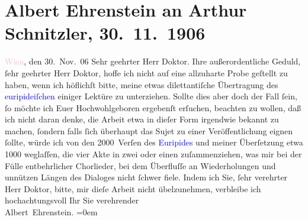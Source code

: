

               \section[Albert Ehrenstein an Arthur Schnitzler, 30. 11. 1906]{ Albert Ehrenstein an Arthur Schnitzler, 30. 11. 1906}\nopagebreak{}\rehead{ }\normalsize\beginnumbering{} \toendnotes[C]{\smallbreak\pagebreak[2]} 
\toendnotes[C]{\smallbreak}\pstart
           \raggedleft{}{\pb}\textcolor{pink}{Wien}{}\ledrightnote{\textcolor{pink}{Wien}}, den 30. Nov. 06\pend
           \pstart{}Sehr geehrter Herr Doktor.\pend\pstart
           Ihre außerordentliche Geduld, ſehr geehrter Herr Doktor, hoffe ich nicht auf eine
                    allzuharte Probe geſtellt zu haben, wenn ich höflichſt bitte, meine etwas
                    dilettantiſche Übertragung des \textcolor{blue}{euripideiſchen}{}\ledrightnote{\textcolor{blue}{Euripides}}{ }\label{K_L01640_1v}\label{K_L01640_1h} einiger Lektüre zu
                    unterziehen. Sollte dies aber doch der Fall ſein, ſo möchte ich Euer
                    Hochwohlgeboren ergebenſt erſuchen, beachten zu wollen, daß ich nicht daran
                    denke, die Arbeit etwa in dieſer Form {\pb}irgendwie bekannt zu machen, ſondern falls ſich überhaupt das Sujet zu einer
                    Veröffentlichung eignen ſollte, würde ich von den 2000 Verſen des \textcolor{blue}{Euripides}{}\ledrightnote{\textcolor{blue}{Euripides}} und meiner Überſetzung etwa 1000
                    weglaſſen, die vier Akte in zwei oder einen zuſammenziehen, was mir bei der
                    Fülle entbehrlicher Chorlieder, bei dem Überfluſſe an Wiederholungen und
                    unnützen Längen des Dialoges nicht ſchwer fiele. Indem ich Sie, ſehr verehrter
                    Herr Doktor, bitte, mir dieſe Arbeit nicht übelzunehmen, verbleibe ich
                    hochachtungsvoll\pend
           \pstart
           Ihr Sie verehrender{\\[\baselineskip]}\spacefill\mbox{Albert Ehrenstein.}\pend
           \leftskip=0em{}\endnumbering{}  
      